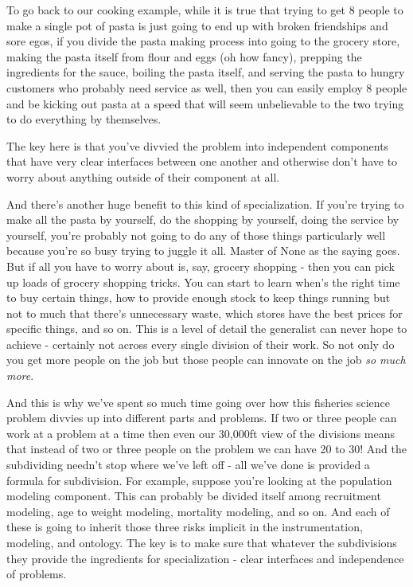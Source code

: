 \documentclass[11pt,a5paper]{book}
\begin{document}
To go back to our cooking example, while it is true that trying to get 8 people to make a single pot of pasta is just going to end up with broken friendships and sore egos, if you divide the pasta making process into going to the grocery store, making the pasta itself from flour and eggs (oh how fancy), prepping the ingredients for the sauce, boiling the pasta itself, and serving the pasta to hungry customers who probably need service as well, then you can easily employ 8 people and be kicking out pasta at a speed that will seem unbelievable to the two trying to do everything by themselves. 
\newline

The key here is that you've divvied the problem into independent components that have very clear interfaces between one another and otherwise don't have to worry about anything outside of their component at all.
\newline

And there's another huge benefit to this kind of specialization. If you're trying to make all the pasta by yourself, do the shopping by yourself, doing the service by yourself, you're probably not going to do any of those things particularly well because you're so busy trying to juggle it all. Master of None as the saying goes. But if all you have to worry about is, say, grocery shopping - then you can pick up loads of grocery shopping tricks. You can start to learn when's the right time to buy certain things, how to provide enough stock to keep things running but not to much that there's unnecessary waste, which stores have the best prices for specific things, and so on. This is a level of detail the generalist can never hope to achieve - certainly not across every single division of their work. So not only do you get more people on the job but those people can innovate on the job \textit{so much more}. 
\newline

And this is why we've spent so much time going over how this fisheries science problem divvies up into different parts and problems. If two or three people can work at a problem at a time then even our 30,000ft view of the divisions means that instead of two or three people on the problem we can have 20 to 30! And the subdividing needn't stop where we've left off - all we've done is provided a formula for subdivision. For example, suppose you're looking at the population modeling component. This can probably be divided itself among recruitment modeling, age to weight modeling, mortality modeling, and so on. And each of these is going to inherit those three risks implicit in the instrumentation, modeling, and ontology. The key is to make sure that whatever the subdivisions they provide the ingredients for specialization - clear interfaces and independence of problems. 
\newline
\end{document}
